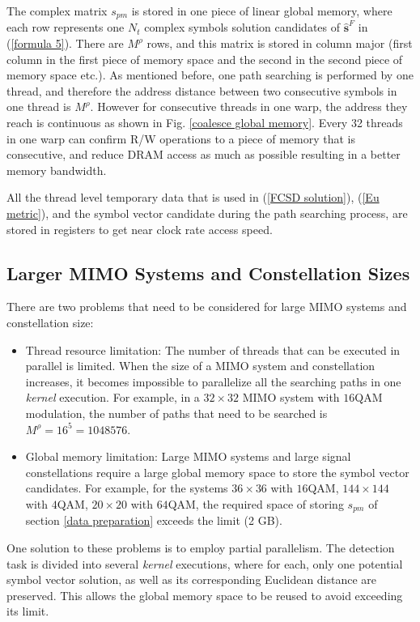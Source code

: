 \documentclass[letterpaper, 10pt, conference,twoside]{ieeeconf}
\begin{document}
The complex matrix $\mathit{s_{pm}}$ is stored in one piece of linear global memory, where each row represents one $N_{t}$ complex symbols solution candidates of $\mathbf{\hat{s}}^{F}$ in (\ref{formula 5}). There are $M^{\rho}$ rows, and this matrix is stored in column major (first column in the first piece of memory space and the second in the second piece of memory space etc.). As mentioned before, one path searching is performed by one thread, and therefore the address distance between two consecutive symbols in one thread is $M^{\rho}$. However for consecutive threads in one warp, the address they reach is continuous as shown in Fig. \ref{coalesce global memory}. Every 32 threads in one warp can confirm R/W operations to a piece of memory that is consecutive, and reduce DRAM access as much as possible resulting in a better memory bandwidth.

All the thread level temporary data that is used in (\ref{FCSD solution}), (\ref{Eu metric}), and the symbol vector candidate during the path searching process, are stored in registers to get near clock rate access speed.   

\subsection{Larger MIMO Systems and Constellation Sizes}
There are two problems that need to be considered for large MIMO systems and constellation size:
\begin{itemize}
\item Thread resource limitation:
The number of threads that can be executed in parallel is limited. When the size of a MIMO system and constellation increases, it becomes impossible to parallelize all the searching paths in one \textit{kernel} execution. For example, in a $32\times 32$ MIMO system with $16$QAM modulation, the number of paths that need to be searched is $M^{\rho}=16^{5}=1048576$.  
\item Global memory limitation:
Large MIMO systems and large signal constellations require a large global memory space to store the symbol vector candidates. For example, for the systems $36\times 36$ with $16$QAM, $144\times 144$ with $4$QAM, $20\times 20$ with $64$QAM, the required space of storing $s_{pm}$ of section \ref{data preparation} exceeds the limit (2 GB).
\end{itemize}

One solution to these problems is to employ partial parallelism. The detection task is divided into several \textit{kernel} executions, where for each, only one potential symbol vector solution, as well as its corresponding Euclidean distance are preserved. This allows the global memory space to be reused to avoid exceeding its limit. 
\end{document}
